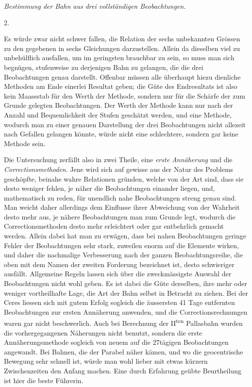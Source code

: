 %
\begin{center}\emph{Bestimmung der Bahn aus drei vollständigen Beobachtungen.}\end{center}
\begin{center}2.\end{center}
Es würde zwar nicht schwer fallen, die Relation der sechs unbekannten Grössen zu den gegebenen in sechs Gleichungen darzustellen. Allein da dieselben viel zu unbehülflich ausfallen, um im geringsten brauchbar zu sein, so muss man sich begnügen, stufenweise zu derjenigen Bahn zu gelangen, die die drei Beobachtungen genau darstellt. Offenbar müssen alle überhaupt hiezu dienliche Methoden am Ende einerlei Resultat geben; die Güte des Endresultats ist also kein Maassstab für den Werth der Methode, sondern nur für die Schärfe der zum Grunde gelegten Beobachtungen. Der Werth der Methode kann nur nach der Anzahl und Bequemlichkeit der Stufen geschätzt werden, und eine Methode, wodurch man zu einer genauen Darstellung der drei Beobachtungen nicht allezeit nach Gefallen gelangen könnte, würde nicht eine schlechtere, sondern gar keine Methode sein.

Die Untersuchung zerfällt also in zwei Theile, eine \emph{erste Annäherung} und die \emph{Correctionsmethoden}. Jene wird sich auf gewisse aus der Natur des Problems geschöpfte, beinahe wahre Relationen gründen, welche von der Art sind, dass sie desto weniger fehlen, je näher die Beobachtungen einander liegen, und, mathematisch zu reden, für unendlich nahe Beobachtungen streng genau sind. Man weicht daher allerdings dem Einflusse ihrer Abweichung von der Wahrheit desto mehr aus, je nähere Beobachtungen man zum Grunde legt, wodurch die Correctionsmethoden desto mehr erleichtert oder gar entbehrlich gemacht werden. Allein dabei hat man zu erwägen, dass bei nahen Beobachtungen geringe Fehler der Beobachtungen sehr stark, zuweilen enorm auf die Elemente wirken, und daher die nachmalige Verbesserung nach der ganzen Beobachtungsreihe, die oben mit dem Namen der zweiten Forderung bezeichnet ist, desto schwieriger ausfällt. Allgemeine Regeln lassen sich über die zweckmässigste Auswahl der Beobachtungen nicht wohl geben. Es ist dabei die Güte derselben, ihre mehr oder weniger vortheilhafte Lage, die Art der Bahn selbst in Betracht zu ziehen. Bei der Ceres liessen sich mit gutem Erfolg sogleich die äussersten 41 Tage entfernten Beobachtungen zur ersten Annäherung anwenden, und die Correctionsrechnungen waren gar nicht beschwerlich. Auch bei Berechnung der II\textsuperscript{ten} Pallasbahn wurden die vorhergegangenen Näherungen nicht benutzt, sondern die erste
%
Annäherungsmethode sogleich von neuem auf die 27tägigen Beobachtungen angewandt. Bei Bahnen, die der Parabel näher kämen, und wo die geocentrische Bewegung sehr schnell ist, würde man wohl lieber mit etwas kürzern Zwischenzeiten den Anfang machen. Eine durch Erfahrung geübte Beurtheilung ist hier die beste Führerin.

